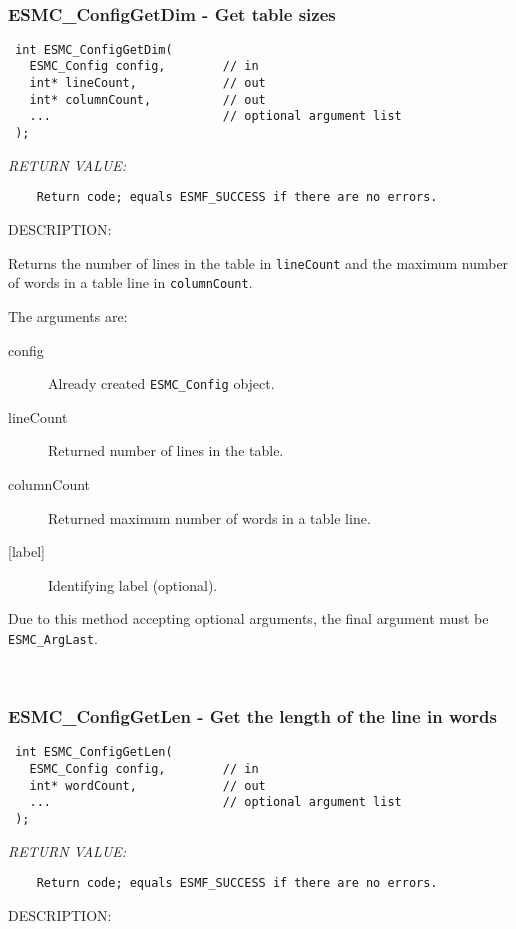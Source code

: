  
\mbox{}\hrulefill\ 
 
\subsubsection [ESMC\_ConfigGetDim] {ESMC\_ConfigGetDim - Get table sizes}


  
\begin{verbatim} int ESMC_ConfigGetDim(
   ESMC_Config config,        // in
   int* lineCount,            // out
   int* columnCount,          // out
   ...                        // optional argument list
 );\end{verbatim}{\em RETURN VALUE:}
\begin{verbatim}    Return code; equals ESMF_SUCCESS if there are no errors.\end{verbatim}
{\sf DESCRIPTION:\\ }


    Returns the number of lines in the table in {\tt lineCount} and
    the maximum number of words in a table line in {\tt columnCount}.
  
     The arguments are:
     \begin{description}
     \item [config]
       Already created {\tt ESMC\_Config} object.
     \item [lineCount]
       Returned number of lines in the table. 
     \item [columnCount]
       Returned maximum number of words in a table line. 
     \item [{[label]}]
       Identifying label (optional).
     \end{description}
  
    Due to this method accepting optional arguments, the final argument
    must be {\tt ESMC\_ArgLast}.
   
 
\mbox{}\hrulefill\ 
 
\subsubsection [ESMC\_ConfigGetLen] {ESMC\_ConfigGetLen - Get the length of the line in words}


  
\begin{verbatim} int ESMC_ConfigGetLen(
   ESMC_Config config,        // in
   int* wordCount,            // out
   ...                        // optional argument list
 );\end{verbatim}{\em RETURN VALUE:}
\begin{verbatim}    Return code; equals ESMF_SUCCESS if there are no errors.\end{verbatim}
{\sf DESCRIPTION:\\ }


